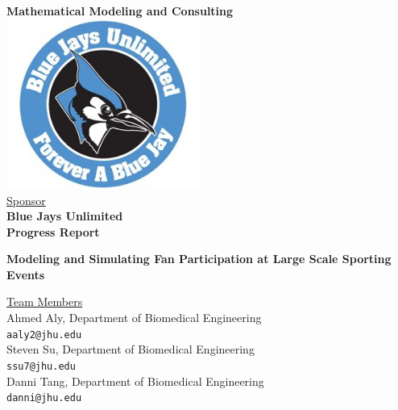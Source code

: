 \documentclass[oneside,12pt]{report}
\begin{document}
\def\thefootnote{\fnsymbol{footnote}}

\thispagestyle{empty}

\def\shiftdowna{0.32in}  %
\def\shiftdownb{0.22in}  %


\begin{center}
\textbf{{\large Mathematical Modeling and Consulting }}\\

\vspace \shiftdowna
\includegraphics[width=2.5in]{BJU.jpg}\\

\vspace \shiftdowna
\underline {Sponsor}\\ 
\vspace{5pt}
\textbf{\large Blue Jays Unlimited} \\
\vspace\shiftdowna
\textbf{{Progress Report}}

\vspace \shiftdowna
\textbf{{\Large Modeling and Simulating Fan Participation at Large Scale Sporting Events}}

\vspace{0.35in}
\underline {Team Members}\\
\vspace{5pt}
Ahmed Aly, Department of Biomedical Engineering\\
\texttt{aaly2@jhu.edu} \\
\vspace{5pt}
Steven Su, Department of Biomedical Engineering\\
\texttt{ssu7@jhu.edu} \\
\vspace{5pt}
Danni Tang, Department of Biomedical Engineering\\
\texttt{danni@jhu.edu} \\


\end{center}
\end{document}
